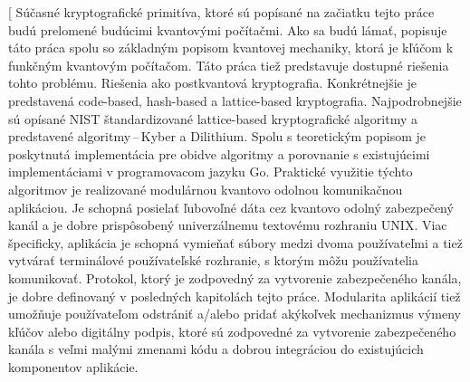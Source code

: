 
\date{7.\,6.\,2023}


\abstract[%
  Súčasné kryptografické primitíva, ktoré sú popísané na začiatku tejto práce budú prelomené budúcimi kvantovými počítačmi. Ako sa budú lámať, popisuje táto práca spolu so základným popisom kvantovej mechaniky, ktorá je kľúčom k funkčným kvantovým počítačom. Táto práca tiež predstavuje dostupné riešenia tohto problému. Riešenia ako postkvantová kryptografia. Konkrétnejšie je predstavená code-based, hash-based a lattice-based kryptografia. Najpodrobnejšie sú opísané NIST štandardizované lattice-based kryptografické algoritmy a predstavené algoritmy\,--\,Kyber a Dilithium. Spolu s teoretickým popisom je poskytnutá implementácia pre obidve algoritmy a porovnanie s existujúcimi implementáciami v programovacom jazyku Go. Praktické využitie týchto algoritmov je realizované modulárnou kvantovo odolnou komunikačnou aplikáciou. Je schopná posielať ľubovoľné dáta cez kvantovo odolný zabezpečený kanál a je dobre prispôsobený univerzálnemu textovému rozhraniu UNIX. Viac špecificky, aplikácia je schopná vymieňať súbory medzi dvoma používateľmi a tiež vytvárať terminálové používateľské rozhranie, s ktorým môžu používatelia komunikovať. Protokol, ktorý je zodpovedný za vytvorenie zabezpečeného kanála, je dobre definovaný v posledných kapitolách tejto práce. Modularita aplikácií tiež umožňuje používateľom odstrániť a/alebo pridať akýkoľvek mechanizmus výmeny kľúčov alebo digitálny podpis, ktoré sú zodpovedné za vytvorenie zabezpečeného kanála s veľmi malými zmenami kódu a dobrou integráciou do existujúcich komponentov aplikácie.
